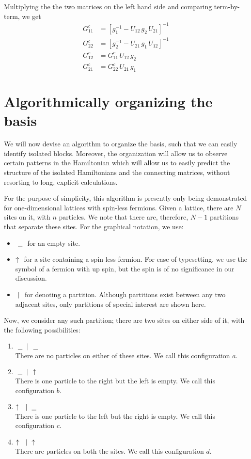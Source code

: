 	Multiplying the the two matrices on the left hand side and comparing term-by-term, we get
	\begin{align}
		\label{eqn:fg11}
		G^{c}_{11} &= \left[ g^{-1}_{1} - U_{12}\,g_2\,U_{21}  \right]^{-1}\\
		\label{eqn:fg22}
		G^{c}_{22} &= \left[ g^{-1}_{2} - U_{21}\,g_1\,U_{12}  \right]^{-1}\\
		\label{eqn:fg12}
		G^{c}_{12} &= G^{c}_{11}\,U_{12}\,g_2\\
		\label{eqn:fg21}
		G^{c}_{21} &= G^{c}_{22}\,U_{21}\,g_1
	\end{align}

\section{Algorithmically organizing the basis}
	We will now devise an algorithm to organize the basis, such that we can easily identify isolated blocks. Moreover, the organization will allow us to observe certain patterns in the Hamiltonian which will allow us to easily predict the structure of the isolated Hamiltonians and the connecting matrices, without resorting to long, explicit calculations.
	
	For the purpose of simplicity, this algorithm is presently only being demonstrated for one-dimensional lattices with spin-less fermions. Given a lattice, there are $ N $ sites on it, with $ n $ particles. We note that there are, therefore, $ N-1 $ partitions that separate these sites. For the graphical notation, we use:
	\begin{itemize}
		\item $ \ \underline{\ \ }\  $ for an empty site.
		\item $ \uparrow\  $ for a site containing a spin-less fermion. For ease of typesetting, we use the symbol of a fermion with up spin, but the spin is of no significance in our discussion.
		\item $ \ |\  $ for denoting a partition. Although partitions exist between any two adjacent sites, only partitions of special interest are shown here.
 	\end{itemize}
	
	Now, we consider any such partition; there are two sites on either side of it, with the following possibilities:
	\begin{enumerate}
		\item $ \ \underline{\ \ }\  \ |\  \ \underline{\ \ }\  $\\ 
		There are no particles on either of these sites. We call this configuration $ a $.
		\item  $ \ \underline{\ \ }\  \ |\  \uparrow\  $\\
		There is one particle to the right but the left is empty. We call this configuration $ b $.
		\item $ \uparrow\  \ |\  \ \underline{\ \ }\  $\\
		There is one particle to the left but the right is empty. We call this configuration $ c $.
		\item $ \uparrow\  \ |\  \uparrow\  $\\
		There are particles on both the sites. We call this configuration $ d $.
	\end{enumerate}
	
